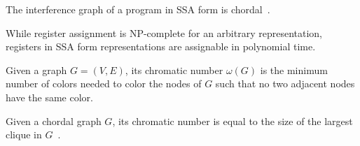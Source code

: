 \begin{theorem}[Chordality]
    The interference graph of a program in SSA form is chordal~\cite{...}.
\end{theorem}


While register assignment is NP-complete for an arbitrary representation, registers in SSA form representations are assignable in polynomial time.

\begin{definition}\label{def:chromatic}
    Given a graph $G = (V, E)$, its chromatic number $\omega(G)$ is the minimum number of colors needed to color the nodes of $G$ such that no two adjacent nodes have the same color.
\end{definition}

\begin{theorem}\label{thm:chordal-chromatic}
    Given a chordal graph $G$, its chromatic number is equal to the size of the largest clique in $G$~\cite{...}.
\end{theorem}